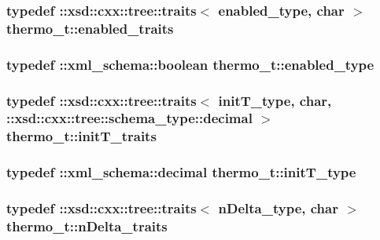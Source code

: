 \hypertarget{classthermo__t_a3519860d0f767ed502e2be7b8fe6ed82}{
\subsubsection[{enabled\-\_\-traits}]{\setlength{\rightskip}{0pt plus 5cm}typedef \-::xsd\-::cxx\-::tree\-::traits$<$ {\bf enabled\-\_\-type}, char $>$ {\bf thermo\-\_\-t\-::enabled\-\_\-traits}}}\label{classthermo__t_a3519860d0f767ed502e2be7b8fe6ed82}
\hypertarget{classthermo__t_adf9ac04cf37c2de46153e42511aa24c2}{
\subsubsection[{enabled\-\_\-type}]{\setlength{\rightskip}{0pt plus 5cm}typedef \-::{\bf xml\-\_\-schema\-::boolean} {\bf thermo\-\_\-t\-::enabled\-\_\-type}}}\label{classthermo__t_adf9ac04cf37c2de46153e42511aa24c2}
\hypertarget{classthermo__t_a078bc14d3b7eb9c04aa1457e24ab7c20}{
\subsubsection[{init\-T\-\_\-traits}]{\setlength{\rightskip}{0pt plus 5cm}typedef \-::xsd\-::cxx\-::tree\-::traits$<$ {\bf init\-T\-\_\-type}, char, \-::xsd\-::cxx\-::tree\-::schema\-\_\-type\-::decimal $>$ {\bf thermo\-\_\-t\-::init\-T\-\_\-traits}}}\label{classthermo__t_a078bc14d3b7eb9c04aa1457e24ab7c20}
\hypertarget{classthermo__t_a29526c32fe31feb33a21833b0040dca7}{
\subsubsection[{init\-T\-\_\-type}]{\setlength{\rightskip}{0pt plus 5cm}typedef \-::{\bf xml\-\_\-schema\-::decimal} {\bf thermo\-\_\-t\-::init\-T\-\_\-type}}}\label{classthermo__t_a29526c32fe31feb33a21833b0040dca7}
\hypertarget{classthermo__t_a3e5d5b74c529cbcb267f55385bbb1088}{
\subsubsection[{n\-Delta\-\_\-traits}]{\setlength{\rightskip}{0pt plus 5cm}typedef \-::xsd\-::cxx\-::tree\-::traits$<$ {\bf n\-Delta\-\_\-type}, char $>$ {\bf thermo\-\_\-t\-::n\-Delta\-\_\-traits}}}\label{classthermo__t_a3e5d5b74c529cbcb267f55385bbb1088}
